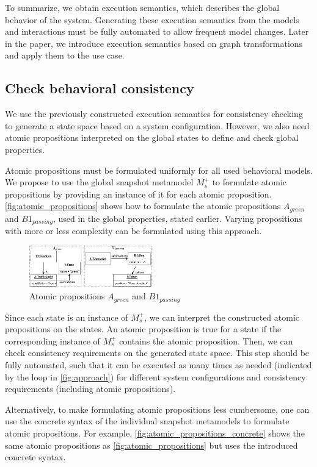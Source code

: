 \documentclass{jot}
\begin{document}
To summarize, we obtain execution semantics, which describes the global behavior of the system.
Generating these execution semantics from the models and interactions must be fully automated to allow frequent model changes.
Later in the paper, we introduce execution semantics based on graph transformations and apply them to the use case.

\subsection{Check behavioral consistency}
We use the previously constructed execution semantics for consistency checking to generate a state space based on a system configuration.
However, we also need atomic propositions interpreted on the global states to define and check global properties.

Atomic propositions must be formulated uniformly for all used behavioral models.
We propose to use the global snapshot metamodel $M_s^+$ to formulate atomic propositions by providing an instance of it for each atomic proposition.
\autoref{fig:atomic_propositions} shows how to formulate the atomic propositions $A_{green}$ and $B1_{passing}$, used in the global properties, stated earlier.
Varying propositions with more or less complexity can be formulated using this approach.

\begin{figure}[h]
    \centering
    \includegraphics[width=0.475\textwidth]{figures/atomic_props.pdf}
    \caption{Atomic propositions $A_{green}$ and $B1_{passing}$}
    \label{fig:atomic_propositions}
\end{figure}

Since each state is an instance of $M_s^+$, we can interpret the constructed atomic propositions on the states.
An atomic proposition is true for a state if the corresponding instance of $M_s^+$ contains the atomic proposition.
Then, we can check consistency requirements on the generated state space.
This step should be fully automated, such that it can be executed as many times as needed (indicated by the loop in \autoref{fig:approach}) for different system configurations and consistency requirements (including atomic propositions).

Alternatively, to make formulating atomic propositions less cumbersome, one can use the concrete syntax of the individual snapshot metamodels to formulate atomic propositions.
For example, \autoref{fig:atomic_propositions_concrete} shows the same atomic propositions as \autoref{fig:atomic_propositions} but uses the introduced concrete syntax.
\end{document}
